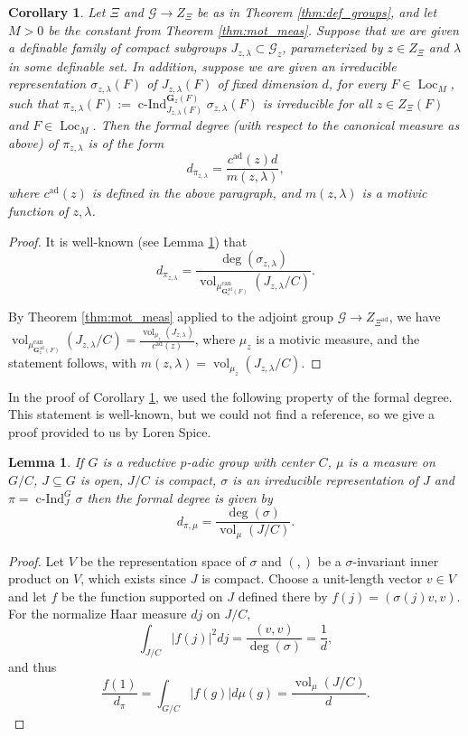 \documentclass{amsart}
\newcommand{\cF}{\mathcal{F}}
\newcommand{\cG}{\mathcal{G}}
\DeclareMathOperator{\vol}{vol}
\DeclareMathOperator{\loc}{Loc}
\DeclareMathOperator{\ind}{c-Ind}
\newcommand{\bG}{\mathbf{G}}
\newcommand{\can}{\mathrm{can}}
\newcommand\ad{\mathrm{ad}}
\theoremstyle{plain}
\newtheorem{lem}[thm]{Lemma}
\newtheorem{cor}[thm]{Corollary}
\theoremstyle{definition}
\begin{document}
\begin{cor} \label{cor:form_deg} Let $\Xi$ 
and $\cG \to Z_\Xi$ be as in Theorem \ref{thm:def_groups}, and let $M>0$ be the constant from Theorem \ref{thm:mot_meas}.
Suppose that we are given a definable family of compact subgroups $J_{z, \lambda} \subset \cG_z$,
parameterized by $z \in Z_\Xi$ and $\lambda$ in some definable set.
In addition, suppose we are given an irreducible representation  
$\sigma_{z, \lambda}(F)$ of $J_{z, \lambda}(F)$ of fixed dimension $d$, for every $F\in \loc_M$, such 
that $\pi_{z,\lambda}(F) := \ind_{J_{z,\lambda}(F)}^{\bG_z(F)} \sigma_{z,\lambda}(F)$
is irreducible for all $z \in Z_\Xi(F)$ and $F \in \loc_M$.
Then the formal degree (with respect to the canonical measure as above) of $\pi_{z, \lambda}$ is of the form 
\[
d_{\pi_{z, \lambda}}=\frac{c^\ad(z)d}{m(z, \lambda)},
\]
where $c^\ad(z)$ is defined in the above paragraph, and 
$m(z, \lambda)$ is a motivic function of $z, \lambda$. 
\end{cor}
\begin{proof}
It is well-known (see Lemma \ref{lem:well-known}) that
\begin{equation}\label{eq:well-known}
d_{\pi_{z, \lambda}}=\frac{\deg(\sigma_{z, \lambda})}{\vol_{\mu_{\bG_z^\ad(F)}^\can}(J_{z, \lambda}/C)}.
\end{equation}

By Theorem \ref{thm:mot_meas} applied to the adjoint group $\cG\to Z_{\Xi^\ad}$, we have $\vol_{\mu_{\bG_z^\ad(F)}^\can}(J_{z, \lambda}/C) = \frac{\vol_{\mu_z}(J_{z, \lambda})}{c^\ad(z)}$, where $\mu_z$ is a motivic measure, 
and the statement follows, with $m(z, \lambda)=\vol_{\mu_z}(J_{z, \lambda}/C)$.
\end{proof}

In the proof of Corollary \ref{cor:form_deg}, we used the following property of the formal degree.
This statement is well-known, but we could not find a reference, so we give a proof provided to us by Loren Spice.

\begin{lem} \label{lem:well-known}
If $G$ is a reductive $p$-adic group with center $C$, $\mu$ is a measure on $G/C$, $J \subseteq G$ is open, $J/C$ is compact,
$\sigma$ is an irreducible representation of $J$ and $\pi = \ind_J^G \sigma$ then the formal degree is given by
\[
d_{\pi,\mu} = \frac{\deg(\sigma)}{\vol_\mu(J/C)}.
\]
\end{lem}
\begin{proof}
Let $V$ be the representation space of $\sigma$ and $(,)$ be a $\sigma$-invariant
inner product on $V$, which exists since $J$ is compact.
Choose a unit-length vector $v \in V$ and let $f$ be the function supported on $J$
defined there by $f(j) = (\sigma(j)v,v)$.  For the normalize Haar measure $dj$ on $J/C$,
\[
\int_{J/C} \lvert f(j)\rvert^2 dj = \frac{(v,v)}{\deg(\sigma)} = \frac{1}{d},
\]
and thus
\[
\frac{f(1)}{d_\pi} = \int_{G/C} \lvert f(g) \rvert d\mu(g) = \frac{\vol_\mu(J/C)}{d}.
\]
\end{proof}
\end{document}
